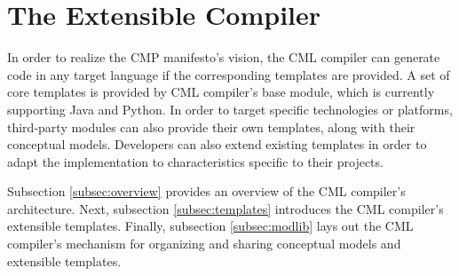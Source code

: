 \section{The Extensible Compiler}\label{sec:compiler}

In order to realize the CMP \cite{cmp} manifesto's vision,
the CML compiler can generate code in any target language
if the corresponding templates are provided.
A set of core templates is provided by CML compiler's base module,
which is currently supporting Java and Python.
In order to target specific technologies or platforms,
third-party modules can also provide their own templates,
along with their conceptual models.
Developers can also extend existing templates
in order to adapt the implementation to characteristics specific to their projects.

Subsection \ref{subsec:overview} provides an overview of the CML compiler's architecture.
Next, subsection \ref{subsec:templates} introduces the CML compiler's extensible templates.
Finally, subsection \ref{subsec:modlib} lays out the CML compiler's mechanism for organizing and sharing conceptual models and extensible templates.





